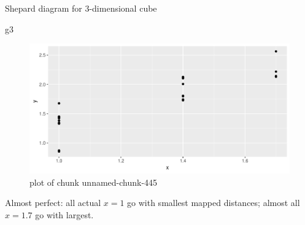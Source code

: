 \documentclass[ignorenonframetext,]{beamer}
\newenvironment{Shaded}{\begin{snugshade}}{\end{snugshade}}
\newcommand{\NormalTok}[1]{#1}
\begin{document}
\begin{frame}[fragile]{Shepard diagram for 3-dimensional cube}
\protect\hypertarget{shepard-diagram-for-3-dimensional-cube}{}

\begin{Shaded}
\begin{Highlighting}[]
\NormalTok{g3}
\end{Highlighting}
\end{Shaded}

\begin{figure}
\centering
\includegraphics{figure/unnamed-chunk-445-1.pdf}
\caption{plot of chunk unnamed-chunk-445}
\end{figure}

Almost perfect: all actual \(x=1\) go with smallest mapped distances;
almost all \(x=1.7\) go with largest.

\end{frame}
\end{document}
